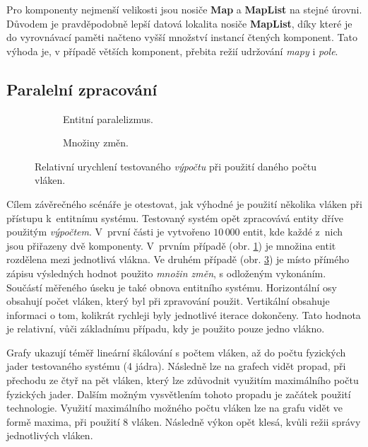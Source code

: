 Pro komponenty nejmenší velikosti jsou nosiče \textbf{Map} a \textbf{MapList} na stejné úrovni. Důvodem je pravděpodobně lepší datová lokalita nosiče \textbf{MapList}, díky které je do vyrovnávací paměti načteno vyšší množství instancí čtených komponent. Tato výhoda je, v případě větších komponent, přebita režií udržování \emph{mapy} i \emph{pole}. 

\subsection{Paralelní zpracování}

\begin{figure}[H]
		\centering
	\begin{subfigure}[b]{0.49\textwidth}
		\caption{Entitní paralelizmus.}\label{Fig:EVALPar}
	\end{subfigure}
	\begin{subfigure}[b]{0.49\textwidth}
		\caption{Množiny změn.}\label{Fig:EVALChangeset}
	\end{subfigure}
	\caption{Relativní urychlení testovaného \emph{výpočtu} při použití daného počtu vláken.}
\end{figure}

Cílem závěrečného scénáře je otestovat, jak výhodné je použití několika vláken při přístupu k~entitnímu systému. Testovaný systém opět zpracovává entity dříve použitým \emph{výpočtem}. V~první části je vytvořeno $10\,000$ entit, kde každé z~nich jsou přiřazeny dvě komponenty. V~prvním případě (obr. \ref{Fig:EVALPar}) je množina entit rozdělena mezi jednotlivá vlákna. Ve druhém případě (obr. \ref{Fig:EVALChangeset}) je místo přímého zápisu výsledných hodnot použito \emph{množin změn}, s odloženým vykonáním. Součástí měřeného úseku je také obnova entitního systému. Horizontální osy obsahují počet vláken, který byl při zpravování použit. Vertikální obsahuje informaci o tom, kolikrát rychleji byly jednotlivé iterace dokončeny. Tato hodnota je relativní, vůči základnímu případu, kdy je použito pouze jedno vlákno.

Grafy ukazují téměř lineární škálování s počtem vláken, až do počtu fyzických jader testovaného systému (4 jádra). Následně lze na grafech vidět propad, při přechodu ze čtyř na pět vláken, který lze zdůvodnit využitím maximálního počtu fyzických jader. Dalším možným vysvětlením tohoto propadu je začátek použití technologie. Využití maximálního možného počtu vláken lze na grafu vidět ve formě maxima, při použití 8 vláken. Následně výkon opět klesá, kvůli režii správy jednotlivých vláken.

